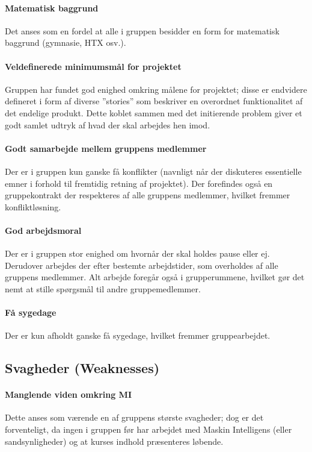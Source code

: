 \paragraph{Matematisk baggrund}
Det anses som en fordel at alle i gruppen besidder en form for matematisk baggrund (gymnasie, HTX osv.).

\paragraph{Veldefinerede minimumsmål for projektet}
Gruppen har fundet god enighed omkring målene for projektet; disse er endvidere defineret i form af diverse ''stories'' som beskriver en overordnet funktionalitet af det endelige produkt.
Dette koblet sammen med det initierende problem giver et godt samlet udtryk af hvad der skal arbejdes hen imod.

\paragraph{Godt samarbejde mellem gruppens medlemmer}
Der er i gruppen kun ganske få konflikter (navnligt når der diskuteres essentielle emner i forhold til fremtidig retning af projektet).
Der forefindes også en gruppekontrakt der respekteres af alle gruppens medlemmer, hvilket fremmer konfliktløsning.

\paragraph{God arbejdsmoral}
Der er i gruppen stor enighed om hvornår der skal holdes pause eller ej.
Derudover arbejdes der efter bestemte arbejdstider, som overholdes af alle gruppens medlemmer.
Alt arbejde foregår også i grupperummene, hvilket gør det nemt at stille spørgsmål til andre gruppemedlemmer.

\paragraph{Få sygedage}
Der er kun afholdt ganske få sygedage, hvilket fremmer gruppearbejdet.

\subsection{Svagheder \textnormal{(\textbf{W}eaknesses)}}\label{swot:weaknesses}

\paragraph{Manglende viden omkring MI}\label{swot:manglende_viden_mi}
Dette anses som værende en af gruppens største svagheder; dog er det forventeligt, da ingen i gruppen før har arbejdet med Maskin Intelligens (eller sandsynligheder) og at kurses indhold præsenteres løbende.

